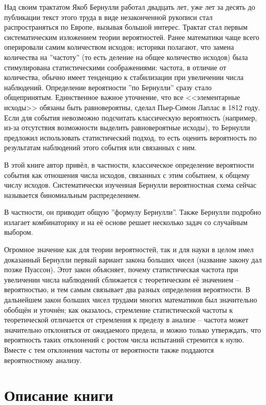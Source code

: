 \documentclass[12pt]{article}
\begin{document}
Над своим трактатом Якоб Бернулли работал двадцать лет, уже лет за десять до публикации текст этого труда в виде незаконченной рукописи стал распространяться по Европе, вызывая большой интерес. 
Трактат стал первым систематическим изложением теории вероятностей. 
Ранее математики чаще всего оперировали самим количеством исходов; историки полагают, что замена количества на ''частоту'' (то есть деление на общее количество исходов) была стимулирована статистическими соображениями: частота, в отличие от количества, обычно имеет тенденцию к стабилизации при увеличении числа наблюдений. Определение вероятности ''по Бернулли'' сразу стало общепринятым.
Единственное важное уточнение, что все <<элементарные исходы>> обязаны быть равновероятны, сделал Пьер-Симон Лаплас в 1812 году. 
Если для события невозможно подсчитать классическую вероятность (например, из-за отсутствия возможности выделить равновероятные исходы), то Бернулли предложил использовать статистический подход, то есть оценить вероятность по результатам наблюдений этого события или связанных с ним.

В этой книге автор привёл, в частности, классическое определение вероятности события как отношения числа исходов, связанных с этим событием, к общему числу исходов. 
Систематически изученная Бернулли вероятностная схема сейчас называется биномиальным распределением.

В частности, он приводит общую ''формулу Бернулли''. 
Также Бернулли подробно излагает комбинаторику и на её основе решает несколько задач со случайным выбором.

Огромное значение как для теории вероятностей, так и для науки в целом имел доказанный Бернулли первый вариант закона больших чисел (название закону дал позже Пуассон). 
Этот закон объясняет, почему статистическая частота при увеличении числа наблюдений сближается с теоретическим её значением -- вероятностью, и тем самым связывает два разных определения вероятности. 
В дальнейшем закон больших чисел трудами многих математиков был значительно обобщён и уточнён; как оказалось, стремление статистической частоты к теоретической отличается от стремления к пределу в анализе -- частота может значительно отклоняться от ожидаемого предела, и можно только утверждать, что вероятность таких отклонений с ростом числа испытаний стремится к нулю. Вместе с тем отклонения частоты от вероятности также поддаются вероятностному анализу.

\newpage
\section{Описание книги}
\end{document}
